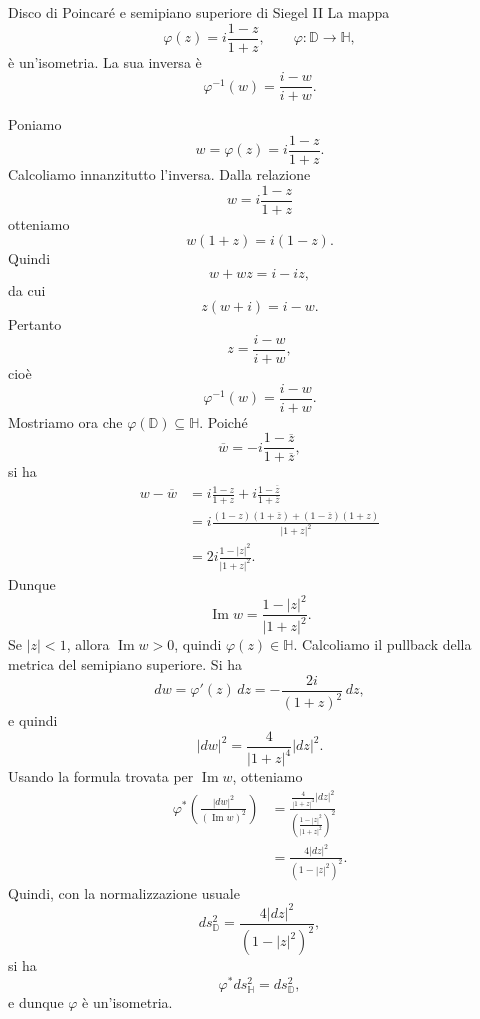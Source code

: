 \documentclass[a4paper]{article}
\begin{document}

\begin{snippetproposition}{Disco di Poincaré e semipiano superiore di Siegel II}
    La mappa
    \[
        \varphi(z)=i\frac{1-z}{1+z},
        \qquad
        \varphi\colon\mathbb{D}\longrightarrow\mathbb{H},
    \]
    è un'isometria. La sua inversa è
    \[
        \varphi^{-1}(w)=\frac{i-w}{i+w}.
    \]
\end{snippetproposition}

\begin{snippetproof}{}
    Poniamo
    \[
        w=\varphi(z)=i\frac{1-z}{1+z}.
    \]
    Calcoliamo innanzitutto l'inversa. Dalla relazione
    \[
        w=i\frac{1-z}{1+z}
    \]
    otteniamo
    \[
        w(1+z)=i(1-z).
    \]
    Quindi
    \[
        w+wz=i-iz,
    \]
    da cui
    \[
        z(w+i)=i-w.
    \]
    Pertanto
    \[
        z=\frac{i-w}{i+w},
    \]
    cioè
    \[
        \varphi^{-1}(w)=\frac{i-w}{i+w}.
    \]
    Mostriamo ora che \(\varphi(\mathbb{D})\subseteq\mathbb{H}\). Poiché
    \[
        \overline{w}
        =
        -i\frac{1-\overline z}{1+\overline z},
    \]
    si ha
    \begin{align*}
        w-\overline w
        &=
        i\frac{1-z}{1+z}
        +
        i\frac{1-\overline z}{1+\overline z}\\
        &=
        i\frac{(1-z)(1+\overline z)+(1-\overline z)(1+z)}{|1+z|^2}\\
        &=
        2i\frac{1-|z|^2}{|1+z|^2}.
    \end{align*}
    Dunque
    \[
        \operatorname{Im}w
        =
        \frac{1-|z|^2}{|1+z|^2}.
    \]
    Se \(|z|<1\), allora \(\operatorname{Im}w>0\), quindi \(\varphi(z)\in\mathbb{H}\).
    Calcoliamo il pullback della metrica del semipiano superiore. Si ha
    \[
        dw
        =
        \varphi'(z)\,dz
        =
        -\frac{2i}{(1+z)^2}\,dz,
    \]
    e quindi
    \[
        |dw|^2
        =
        \frac{4}{|1+z|^4}|dz|^2.
    \]
    Usando la formula trovata per \(\operatorname{Im}w\), otteniamo
    \begin{align*}
        \varphi^*\left(\frac{|dw|^2}{(\operatorname{Im}w)^2}\right)
        &=
        \frac{\frac{4}{|1+z|^4}|dz|^2}
        {\left(\frac{1-|z|^2}{|1+z|^2}\right)^2}\\
        &=
        \frac{4|dz|^2}{(1-|z|^2)^2}.
    \end{align*}
    Quindi, con la normalizzazione usuale
    \[
        ds^2_{\mathbb{D}}
        =
        \frac{4|dz|^2}{(1-|z|^2)^2},
    \]
    si ha
    \[
        \varphi^*ds^2_{\mathbb{H}}=ds^2_{\mathbb{D}},
    \]
    e dunque \(\varphi\) è un'isometria.
\end{snippetproof}
\end{document}
